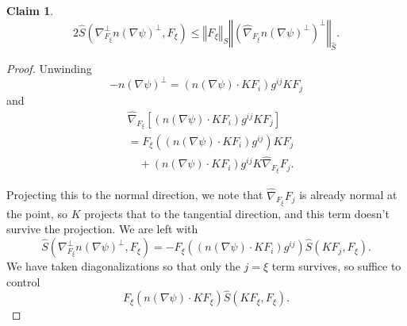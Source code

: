 \documentclass[12pt,letterpaper]{amsart}%
\newcounter{mycounter}
\numberwithin{mycounter}{section}
\theoremstyle{plain}
\newtheorem{claim}[mycounter]{Claim}
\numberwithin{equation}{section}
\theoremstyle{definition}
\newcommand{\maxidx}{\mathord{\xi}} %
\begin{document}
\begin{claim} \label{annoying}%
\[
2\hat{S}\left(  \nabla_{F_{\maxidx}}^{\perp}n\left(  \nabla\psi\right)  ^{\perp}
,F_{\maxidx}\right)  \leq\left\Vert F_{\maxidx}\right\Vert _{S}\left\Vert \left(
\hat{\nabla}_{F_{\maxidx}}n\left(  \nabla\psi\right)  ^{\perp}\right)  ^{\perp}
\right\Vert _{\hat{S}}.
\]
\end{claim}

\begin{proof}
Unwinding
\[
-n\left(  \nabla\psi\right)  ^{\perp}
=\left(  n\left(  \nabla\psi\right)  \cdot KF_{i}\right)  g^{ij}KF_{j}
\]
and
\begin{align*}
&\hat{\nabla}_{F_{\maxidx}}\left[\left(  n\left(  \nabla\psi\right)  \cdot KF_{i}\right)
g^{ij}KF_{j}\right]\\
& =F_{\maxidx}\left(  \left(  n\left(  \nabla\psi\right)  \cdot KF_{i}\right)
g^{ij}\right)  KF_{j}\\
& \quad +\left(  n\left(  \nabla\psi\right)  \cdot KF_{i}\right)  g^{ij}K\hat
{\nabla}_{F_{\maxidx}}F_{j}.
\end{align*}

Projecting this to the normal direction, we note that $\hat{\nabla}_{F_{\maxidx}}F_{j}$
is already normal at the point, so $K$ projects that to the tangential direction,
and this term doesn't survive the projection. We are left with
\[
\hat{S}\left(  \nabla_{F_{\maxidx}}^{\perp}n\left(  \nabla\psi\right)  ^{\perp}
,F_{\maxidx}\right) =-
F_{\maxidx}\left(  \left(  n\left(  \nabla\psi\right)  \cdot KF_{i}\right)
g^{ij}\right)  \hat{S}\left(  KF_{j},F_{\maxidx}\right).
\]
We have taken diagonalizations so that only the $j=\maxidx$ term survives, so suffice to control
\[
F_{\maxidx}\left(  n\left(  \nabla\psi\right)  \cdot KF_{\maxidx}\right)  \hat{S}\left(
KF_{\maxidx},F_{\maxidx}\right).
\]


\end{proof}
\end{document}
